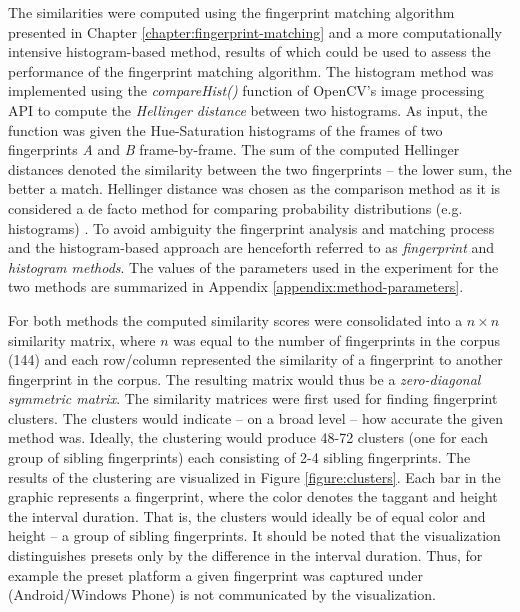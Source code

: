 \documentclass[thesis.tex]{subfiles}
\begin{document}
The similarities were computed using the fingerprint matching algorithm presented in Chapter \ref{chapter:fingerprint-matching} and a more computationally intensive histogram-based method, results of which could be used to assess the performance of the fingerprint matching algorithm. The histogram method was implemented using the \emph{compareHist()} function of OpenCV's image processing API to compute the \emph{Hellinger distance} between two histograms. As input, the function was given the Hue-Saturation histograms of the frames of two fingerprints \emph{A} and \emph{B} frame-by-frame. The sum of the computed Hellinger distances denoted the similarity between the two fingerprints -- the lower sum, the better a match. Hellinger distance was chosen as the comparison method as it is considered a de facto method for comparing probability distributions (e.g. histograms) \cite{hellinger}. To avoid ambiguity the fingerprint analysis and matching process and the histogram-based approach are henceforth referred to as \emph{fingerprint} and \emph{histogram methods}. The values of the parameters used in the experiment for the two methods are summarized in Appendix \ref{appendix:method-parameters}.

For both methods the computed similarity scores were consolidated into a $n\times n$ similarity matrix, where $n$ was equal to the number of fingerprints in the corpus (144) and each row/column represented the similarity of a fingerprint to another fingerprint in the corpus. The resulting matrix would thus be a \emph{zero-diagonal symmetric matrix}. The similarity matrices were first used for finding fingerprint clusters. The clusters would indicate -- on a broad level -- how accurate the given method was. Ideally, the clustering would produce 48-72 clusters (one for each group of sibling fingerprints) each consisting of 2-4 sibling fingerprints. The results of the clustering are visualized in Figure \ref{figure:clusters}. Each bar in the graphic represents a fingerprint, where the color denotes the taggant and height the interval duration. That is, the clusters would ideally be of equal color and height -- a group of sibling fingerprints. It should be noted that the visualization distinguishes presets only by the difference in the interval duration. Thus, for example the preset platform a given fingerprint was captured under (Android/Windows Phone) is not communicated by the visualization.
\end{document}
